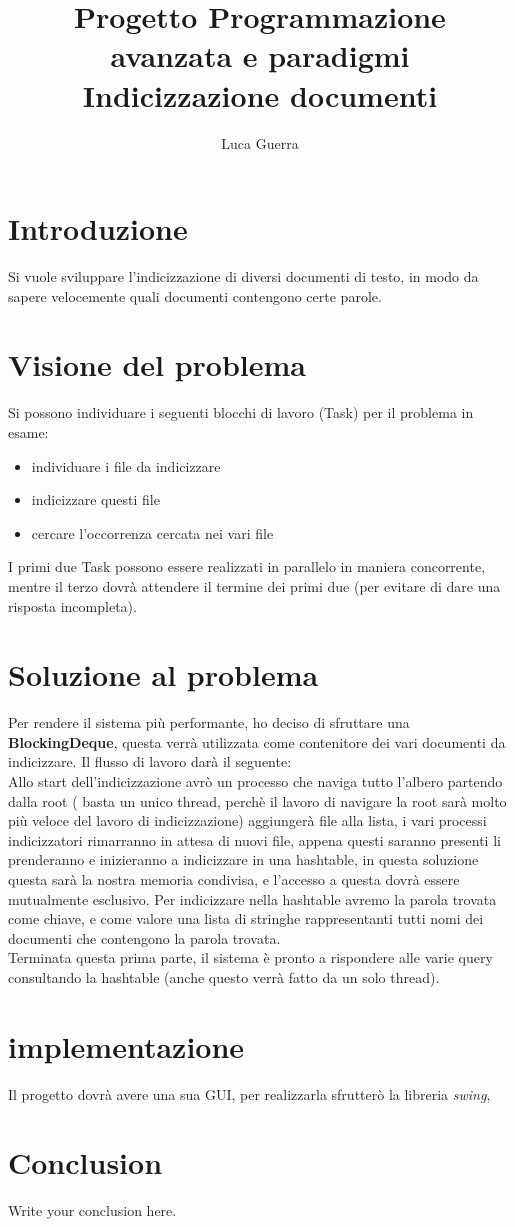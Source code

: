 \documentclass{article}
\begin{document}
\title{Progetto Programmazione avanzata e paradigmi \\ Indicizzazione documenti}

\author{Luca Guerra}

\maketitle

\section{Introduzione}
Si vuole sviluppare l'indicizzazione di diversi documenti di testo, in modo da sapere velocemente quali documenti contengono certe parole.

\section{Visione del problema}
Si possono individuare i seguenti blocchi di lavoro (Task) per il problema in esame:
\begin{itemize}
  \item individuare i file da indicizzare
  \item indicizzare questi file
  \item cercare l'occorrenza cercata nei vari file
\end{itemize} 
I primi due Task possono essere realizzati in parallelo in maniera concorrente, mentre il terzo dovrà attendere il termine dei primi due (per evitare di dare una risposta incompleta).

\section{Soluzione al problema}

Per rendere il sistema più performante, ho deciso di sfruttare una \textbf{BlockingDeque}, questa verrà utilizzata come contenitore dei vari documenti da indicizzare. Il flusso di lavoro darà il seguente: \\
Allo start dell'indicizzazione avrò un processo che naviga tutto l'albero partendo dalla root ( basta un unico thread, perchè il lavoro di navigare la root sarà molto più veloce del lavoro di indicizzazione) aggiungerà file alla lista, i vari processi indicizzatori rimarranno in attesa di nuovi file, appena questi saranno presenti li prenderanno e inizieranno a indicizzare in una hashtable, in questa soluzione questa sarà la nostra memoria condivisa, e l'accesso a questa dovrà essere mutualmente esclusivo.
Per indicizzare nella hashtable avremo la parola trovata come chiave, e come valore una lista di stringhe rappresentanti tutti nomi dei documenti che contengono la parola trovata.\\
Terminata questa prima parte, il sistema è pronto a rispondere alle varie query consultando la hashtable (anche questo verrà fatto da un solo thread).

\section{implementazione}

Il progetto dovrà avere una sua GUI, per realizzarla sfrutterò la libreria \textit{swing}, 
\section{Conclusion}
Write your conclusion here.
\end{document}
